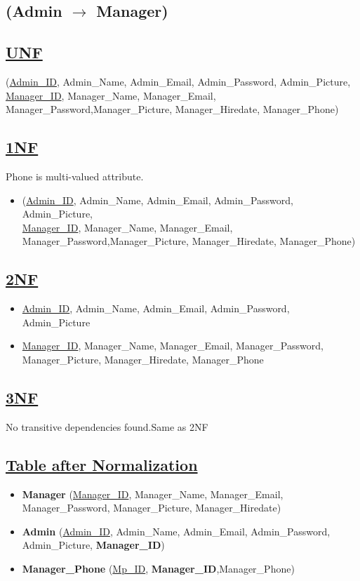 \subsection{\texorpdfstring{\centering (Admin $\rightarrow$ Manager)}{(Admin - Manager)}}


\subsection*{\underline{UNF}}

(\underline{Admin\_ID}, Admin\_Name, Admin\_Email, Admin\_Password, Admin\_Picture,\\
\underline{Manager\_ID}, Manager\_Name, Manager\_Email, Manager\_Password,Manager\_Picture, Manager\_Hiredate, Manager\_Phone)

\subsection*{\underline{1NF}}
Phone is multi-valued attribute.
\vskip 0.2in

\begin{itemize}
    \item (\underline{Admin\_ID}, Admin\_Name, Admin\_Email, Admin\_Password, Admin\_Picture,\\
          \underline{Manager\_ID}, Manager\_Name, Manager\_Email, Manager\_Password,Manager\_Picture, Manager\_Hiredate, Manager\_Phone)
\end{itemize}

\subsection*{\underline{2NF}}
\vskip 0.2in

\begin{itemize}
    \item \underline{Admin\_ID}, Admin\_Name, Admin\_Email, Admin\_Password, Admin\_Picture
    \item \underline{Manager\_ID}, Manager\_Name, Manager\_Email, Manager\_Password, Manager\_Picture, Manager\_Hiredate, Manager\_Phone
\end{itemize}

\subsection*{\underline{3NF}}
No transitive dependencies found.Same as 2NF

\subsection*{\underline{Table after Normalization}}
\vskip 0.2in
\begin{itemize}
    \item \textbf{Manager} (\underline{Manager\_ID}, Manager\_Name, Manager\_Email, Manager\_Password, Manager\_Picture, Manager\_Hiredate)
    \item \textbf{Admin} (\underline{Admin\_ID}, Admin\_Name, Admin\_Email, Admin\_Password, Admin\_Picture, \textbf{Manager\_ID})
    \item \textbf{Manager\_Phone} (\underline{Mp\_ID}, \textbf{Manager\_ID},{Manager\_Phone})
\end{itemize}

\clearpage